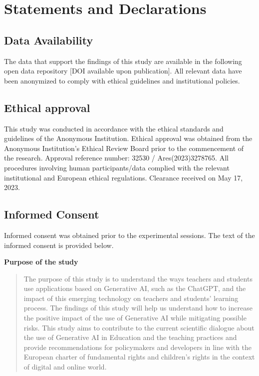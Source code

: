 \documentclass[
  11pt,
]{article}
\begin{document}
\section{Statements and Declarations}\label{statements-and-declarations}

\subsection{Data Availability}\label{data-availability}

The data that support the findings of this study are available in the following open data repository {[}DOI available upon publication{]}. All relevant data have been anonymized to comply with ethical guidelines and institutional policies.

\subsection{Ethical approval}\label{ethical-approval}

This study was conducted in accordance with the ethical standards and guidelines of the Anonymous Institution. Ethical approval was obtained from the Anonymous Institution's Ethical Review Board prior to the commencement of the research. Approval reference number: 32530 / Ares(2023)3278765. All procedures involving human participants/data complied with the relevant institutional and European ethical regulations. Clearance received on May 17, 2023.

\subsection{Informed Consent}\label{informed-consent}

Informed consent was obtained prior to the experimental sessions. The text of the informed consent is provided below.

\textbf{Purpose of the study}

\begin{quote}
The purpose of this study is to understand the ways teachers and students use applications based on Generative AI, such as the ChatGPT, and the impact of this emerging technology on teachers and students' learning process. The findings of this study will help us understand how to increase the positive impact of the use of Generative AI while mitigating possible risks. This study aims to contribute to the current scientific dialogue about the use of Generative AI in Education and the teaching practices and provide recommendations for policymakers and developers in line with the European charter of fundamental rights and children's rights in the context of digital and online world.
\end{quote}
\end{document}
